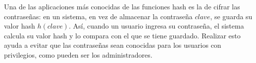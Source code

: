 Una de las aplicaciones más conocidas de las funciones hash es la de
cifrar las contraseñas: en un sistema, en vez de almacenar la contraseña
$clave$, se guarda su valor hash $h(clave)$. Así, cuando un usuario
ingresa su contraseña, el sistema calcula su valor hash y lo compara con
el que se tiene guardado. Realizar esto ayuda a evitar que las
contraseñas sean conocidas para los usuarios con privilegios, como
pueden ser los administradores.

%
%
%
%

